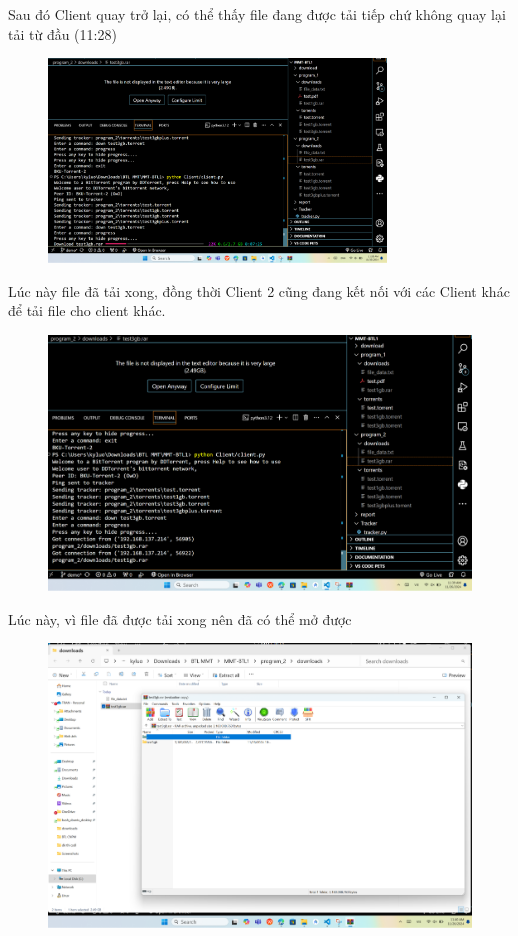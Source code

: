 \documentclass[a4paper]{article}
\begin{document}
Sau đó Client quay trở lại, có thể thấy file đang được tải tiếp chứ không quay lại tải từ đầu (11:28)
\begin{figure}[H]
    \centering
    \includegraphics[width=0.8\textwidth]{images/13.png}
    \captionsetup{labelformat=empty}
\end{figure}
Lúc này file đã tải xong, đồng thời Client 2 cũng đang kết nối với các Client khác để tải file cho client khác.
\begin{figure}[H]
    \centering
    \includegraphics[width=1\textwidth]{images/14.png}
    \captionsetup{labelformat=empty}
\end{figure}
Lúc này, vì file đã được tải xong nên đã có thể mở được
\begin{figure}[H]
    \centering
    \includegraphics[width=1\textwidth]{images/15.png}
    \captionsetup{labelformat=empty}
\end{figure}
\end{document}
